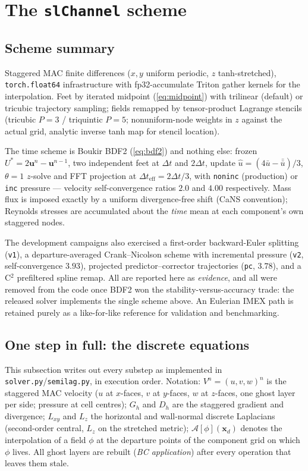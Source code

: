 \documentclass[11pt,a4paper]{article}
\newcommand{\bu}{\mathbf{u}}
\newcommand{\bx}{\mathbf{x}}
\begin{document}
\section{The \texttt{slChannel} scheme}
\label{sec:scheme}


\subsection{Scheme summary}

Staggered MAC finite differences ($x,y$ uniform periodic, $z$
tanh-stretched), \texttt{torch.float64} infrastructure with fp32-accumulate
Triton gather kernels for the interpolation. Feet by iterated midpoint
(\ref{eq:midpoint}) with trilinear (default) or tricubic trajectory sampling;
fields remapped by tensor-product Lagrange stencils (tricubic $P{=}3$ /
triquintic $P{=}5$; nonuniform-node weights in $z$ against the actual grid,
analytic inverse tanh map for stencil location).

The time scheme is Boukir BDF2 (\ref{eq:bdf2}) and nothing else: frozen
$U^{*}=2\bu^{n}-\bu^{n-1}$, two independent feet at $\Delta t$ and
$2\Delta t$, update $\hat u = (4\bar u - \bar{\bar u})/3$, $\theta{=}1$
$z$-solve and FFT projection at $\Delta t_{\mathrm{eff}}=2\Delta t/3$, with
\texttt{noninc} (production) or \texttt{inc} pressure --- velocity
self-convergence ratios $2.0$ and $4.00$ respectively. Mass flux is imposed
exactly by a uniform divergence-free shift (CaNS convention); Reynolds
stresses are accumulated about the \emph{time} mean at each component's own
staggered nodes.

The development campaigns also exercised a first-order
backward-Euler splitting (\texttt{v1}), a departure-averaged
Crank--Nicolson scheme with incremental pressure (\texttt{v2},
self-convergence $3.93$), projected predictor--corrector trajectories
(\texttt{pc}, $3.78$), and a C$^{2}$ prefiltered spline remap. All are
reported here as \emph{evidence}, and all were removed from the code once
BDF2 won the stability-versus-accuracy trade: the released solver implements
the single scheme above. An Eulerian IMEX path is retained purely as a
like-for-like reference for validation and benchmarking.

\subsection{One step in full: the discrete equations}
\label{sec:algorithm}

This subsection writes out every substep as implemented in
\texttt{solver.py}/\texttt{semilag.py}, in execution order. Notation:
$V^{n}=(u,v,w)^{n}$ is the staggered MAC velocity ($u$ at $x$-faces, $v$ at
$y$-faces, $w$ at $z$-faces, one ghost layer per side; pressure at cell
centres); $G_h$ and $D_h$ are the staggered gradient and divergence;
$L_{xy}$ and $L_z$ the horizontal and wall-normal discrete Laplacians
(second-order central, $L_z$ on the stretched metric); $\mathcal A[\phi](\bx_d)$
denotes the interpolation of a field $\phi$ at the departure points of the
component grid on which $\phi$ lives. All ghost layers are rebuilt
(\emph{BC application}) after every operation that leaves them stale.
\end{document}

